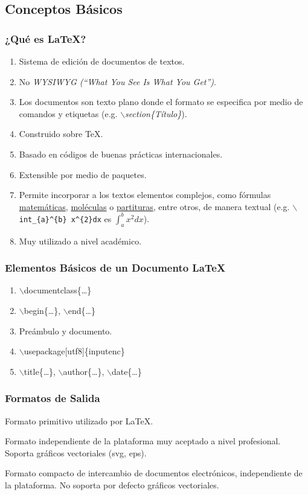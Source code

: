\documentclass[a4paper,slidestop,xcolor=pst,dvips,blue]{beamer}
\newcommand{\command}[1]{$\backslash$#1\{\dots\}}
\begin{document}
\subsection{Conceptos Básicos}

\begin{frame}[c]
    \frametitle{¿Qué es \LaTeX?}
    \begin{enumerate}[<+->]
        \item Sistema de edición de documentos de textos.
        \item No \emph{WYSIWYG (``What You See Is What You Get'')}.
        \item Los documentos son texto plano donde el formato se especifica por medio de comandos y etiquetas (e.g. \emph{$\backslash$section\{Título\}}).
        \item Construido sobre \TeX.
        \item Basado en códigos de buenas prácticas internacionales.
        \item Extensible por medio de paquetes.
        \item Permite incorporar a los textos elementos complejos, como fórmulas \href{https://es.overleaf.com/learn/latex/Mathematical_expressions}{matemáticas}, \href{https://osl.ugr.es/CTAN/macros/generic/chemfig/chemfig-en.pdf}{moléculas} o
            \href{http://tug.ctan.org/info/latex4musicians/latex4musicians.pdf}{partituras}, entre otros, de manera textual (e.g. \texttt{$\backslash$int\_\{a\}\^{}\{b\} x\^{}\{2\}dx} es $\int_{a}^{b} x^{2} dx$).
        \item Muy utilizado a nivel académico.
    \end{enumerate}
\end{frame}

\begin{frame}[c]
    \frametitle{Elementos Básicos de un Documento \LaTeX}
    \begin{enumerate}[<+->]
        \item \command{documentclass}
        \item \command{begin}, \command{end}
        \item Preámbulo y documento.
        \item $\backslash$usepackage[utf8]\{inputenc\}
        \item \command{title}, \command{author}, \command{date}
    \end{enumerate}
\end{frame}

\begin{frame}[c]
    \frametitle{Formatos de Salida}
    \begin{description}[<+->]
        \item[DVI] Formato primitivo utilizado por \LaTeX.
        \item[Postscript] Formato independiente de la plataforma muy aceptado a nivel profesional. Soporta gráficos vectoriales (svg, eps).
        \item[PDF] Formato compacto de intercambio de documentos electrónicos, independiente de la plataforma. No soporta por defecto gráficos vectoriales.
    \end{description}
\end{frame}
\end{document}
